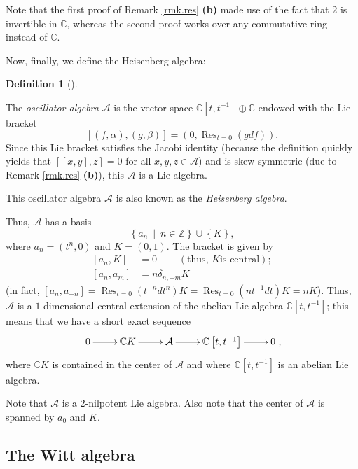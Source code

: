 \documentclass
[numbers=enddot,12pt,final,onecolumn,german,notitlepage]{scrartcl}%
\theoremstyle{definition}
\newtheorem{defi}[theo]{Definition}
\newenvironment{definition}[1][]
{\begin{defi}[#1]\begin{leftbar}}
{\end{leftbar}\end{defi}}
\begin{document}
Note that the first proof of Remark \ref{rmk.res} \textbf{(b)} made use of the
fact that $2$ is invertible in $\mathbb{C}$, whereas the second proof works
over any commutative ring instead of $\mathbb{C}$.

Now, finally, we define the Heisenberg algebra:

\begin{definition}
\label{def.osc}The \textit{oscillator algebra} $\mathcal{A}$ is the vector
space $\mathbb{C}\left[  t,t^{-1}\right]  \oplus\mathbb{C}$ endowed with the
Lie bracket%
\[
\left[  \left(  f,\alpha\right)  ,\left(  g,\beta\right)  \right]  =\left(
0,\operatorname*{Res}\nolimits_{t=0}\left(  gdf\right)  \right)  .
\]
Since this Lie bracket satisfies the Jacobi identity (because the definition
quickly yields that $\left[  \left[  x,y\right]  ,z\right]  =0$ for all
$x,y,z\in\mathcal{A}$) and is skew-symmetric (due to Remark \ref{rmk.res}
\textbf{(b)}), this $\mathcal{A}$ is a Lie algebra.

This oscillator algebra $\mathcal{A}$ is also known as the \textit{Heisenberg
algebra}.
\end{definition}

Thus, $\mathcal{A}$ has a basis
\[
\left\{  a_{n}\ \mid\ n\in\mathbb{Z}\right\}  \cup\left\{  K\right\}  ,
\]
where $a_{n}=\left(  t^{n},0\right)  $ and $K=\left(  0,1\right)  $. The
bracket is given by%
\begin{align*}
\left[  a_{n},K\right]   &  =0\ \ \ \ \ \ \ \ \ \ \left(  \text{thus, }K\text{
is central}\right)  ;\\
\left[  a_{n},a_{m}\right]   &  =n\delta_{n,-m}K
\end{align*}
(in fact, $\left[  a_{n},a_{-n}\right]  =\operatorname*{Res}\nolimits_{t=0}%
\left(  t^{-n}dt^{n}\right)  K=\operatorname*{Res}\nolimits_{t=0}\left(
nt^{-1}dt\right)  K=nK$). Thus, $\mathcal{A}$ is a $1$-dimensional central
extension of the abelian Lie algebra $\mathbb{C}\left[  t,t^{-1}\right]  $;
this means that we have a short exact sequence%
\[
\xymatrix{
0 \ar[r] & \mathbb C K \ar[r] & \mathcal A \ar[r] & \mathbb C\left[t,t^{-1}\right] \ar[r] & 0
},
\]
where $\mathbb{C}K$ is contained in the center of $\mathcal{A}$ and where
$\mathbb{C}\left[  t,t^{-1}\right]  $ is an abelian Lie algebra.

Note that $\mathcal{A}$ is a $2$-nilpotent Lie algebra. Also note that the
center of $\mathcal{A}$ is spanned by $a_{0}$ and $K$.

\subsection{The Witt algebra}
\end{document}
